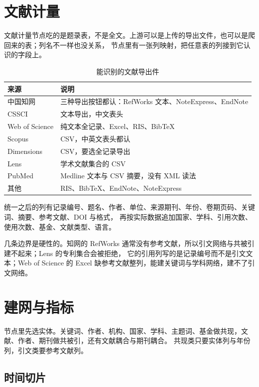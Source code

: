 \section{文献计量}

文献计量节点吃的是题录表，不是全文。上游可以是上传的导出文件，也可以是爬回来的表；列名不一样也没关系，
节点里有一张列映射，把任意表的列接到它认识的字段上。

\begin{table}[H]\centering
\caption{能识别的文献导出件}
\label{tab:biblio-formats}
\small
\begin{tabularx}{\textwidth}{p{3.0cm}X}
\toprule
来源 & 说明 \\
\midrule
中国知网 & 三种导出按钮都认：RefWorks 文本、NoteExpress、EndNote \\
CSSCI & 文本导出，中文表头 \\
Web of Science & 纯文本全记录、Excel、RIS、BibTeX \\
Scopus & CSV，中英文表头都认 \\
Dimensions & CSV，要选全记录导出 \\
Lens & 学术文献集合的 CSV \\
PubMed & Medline 文本与 CSV 摘要，没有 XML 读法 \\
其他 & RIS、BibTeX、EndNote、NoteExpress \\
\bottomrule
\end{tabularx}
\end{table}

统一之后的列有记录编号、题名、作者、单位、来源期刊、年份、卷期页码、关键词、摘要、参考文献、DOI 与格式，
再按实际数据追加国家、学科、引用次数、使用次数、基金、文献类型、语言。

几条边界是硬性的。知网的 RefWorks 通常没有参考文献，所以引文网络与共被引建不起来；Lens 的专利集合会被拒绝，
它的引用列写的是记录编号而不是引文文本；Web of Science 的 Excel 缺参考文献整列，能建关键词与学科网络，建不了引文网络。

\section{建网与指标}

节点里先选实体。关键词、作者、机构、国家、学科、主题词、基金做共现，文献、作者、期刊做共被引，还有文献耦合与期刊耦合。
共现类只要实体列与年份列，引文类要参考文献列。

\subsection{时间切片}

